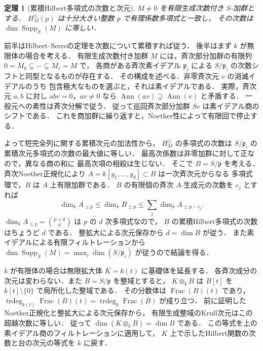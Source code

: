 \documentclass[a5paper,10pt,onecolumn]{jsarticle}
\makeatletter
\theoremstyle{mathnotetheorem}
\newtheorem{theorem}{定理}[section]
\renewcommand{\proofname}{証明}
\renewenvironment{proof}[1][\proofname]{%
  \par\pushQED{\qed}\normalfont\topsep4\p@\@plus2\p@\relax
  \trivlist\item[\hskip\labelsep\bfseries #1]\ignorespaces
}{\popQED\endtrivlist\@endpefalse}
\makeatother
\begin{document}
\begin{theorem}[累積Hilbert多項式の次数と次元]
$M\ne0$ を有限生成次数付き $S$-加群とする．
$H_M^{\le}(p)$ は十分大きい整数 $p$ で有理係数多項式と一致し，
その次数は $\dim\operatorname{Supp}_S(M)$ に等しい．
\end{theorem}
\begin{proof}
前半はHilbert--Serreの定理を次数について累積すれば従う．
後半はまず $k$ が無限体の場合を考える．
有限生成次数付き加群 $M$ には，斉次部分加群の有限列
$0=M_0\subsetneq\cdots\subsetneq M_r=M$ で，
各商がある斉次素イデアル $\mathfrak p_i$ による
$S/\mathfrak p_i$ の次数シフトと同型となるものが存在する．
その構成を述べる．非零斉次元 $v$ の消滅イデアルのうち
包含極大なものを選ぶと，それは素イデアルである．
実際，斉次元 $a,b$ に対し $abv=0$，$av\ne0$ なら
$\operatorname{Ann}(av)\supsetneq\operatorname{Ann}(v)$ と矛盾する．
一般元への素性は斉次分解で従う．
従って巡回斉次部分加群 $Sv$ は素イデアル商のシフトである．
これを商加群に繰り返すと，Noether性によって有限回で停止する．

よって短完全列に関する累積次元の加法性から，
$H_M^{\le}$ の多項式の次数は
$S/\mathfrak p_i$ の累積次元多項式の次数の最大値に等しい．
最高次係数は非零加群に対して正なので，異なる商の和に
最高次項の相殺は生じない．
そこで $B=S/\mathfrak p$ を考える．
斉次Noether正規化により
$A=k[y_1,\ldots,y_d]\subset B$ は一次斉次元からなる
多項式環で，$B$ は $A$ 上有限加群である．
$B$ の有限個の斉次 $A$-生成元の次数を $c_j$ とすれば
\[
 \dim_k A_{\le p}\le\dim_kB_{\le p}
 \le\sum_j\dim_k A_{\le p-c_j}.
\]
$\dim_kA_{\le p}={p+d\choose d}$ は $p$ の $d$ 次多項式なので，
$B$ の累積Hilbert多項式の次数はちょうど $d$ である．
整拡大による次元保存から $d=\dim B$ が従う．
また素イデアルによる有限フィルトレーションから
$\dim\operatorname{Supp}_S(M)=\max_i\dim(S/\mathfrak p_i)$
が従うので結論を得る．

$k$ が有限体の場合は無限拡大体 $K=k(t)$ に基礎体を延長する．
各斉次成分の次元は変わらない．また $B=S/\mathfrak p$ を整域とすると，
$K\otimes_kB$ は $B[t]$ を $k[t]\setminus\{0\}$ で局所化した整域である．
その分数体は $\operatorname{Frac}(B)(t)$ であり，
$\operatorname{trdeg}_{k(t)}\operatorname{Frac}(B)(t)
=\operatorname{trdeg}_k\operatorname{Frac}(B)$ が成り立つ．
前に証明したNoether正規化と整拡大による次元保存から，
有限生成整域のKrull次元はこの超越次数に等しい．
従って $\dim(K\otimes_kB)=\dim B$ である．
この等式を上の素イデアル商のフィルトレーションに適用して，
$K$ 上で示したHilbert関数の次数と台の次元の等式を $k$ に戻す．
\end{proof}
\end{document}
